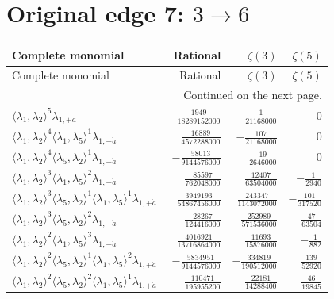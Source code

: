 \section{Original edge 7: $3\to 6$}
\begin{longtable}{@{}lrrr@{}}
\toprule
Complete monomial & Rational & $\zeta(3)$ & $\zeta(5)$ \\
\midrule\endfirsthead
\toprule Complete monomial & Rational & $\zeta(3)$ & $\zeta(5)$ \\
\midrule\endhead
\midrule\multicolumn{4}{r}{Continued on the next page.}\\\endfoot
\bottomrule\endlastfoot
$\langle\lambda_1,\lambda_2\rangle^{5}\lambda_{1,+\dot a}$ & $-\frac{1949}{18289152000}$ & $\frac{1}{21168000}$ & $0$ \\
$\langle\lambda_1,\lambda_2\rangle^{4}\langle\lambda_1,\lambda_5\rangle^{1}\lambda_{1,+\dot a}$ & $\frac{16889}{4572288000}$ & $-\frac{107}{21168000}$ & $0$ \\
$\langle\lambda_1,\lambda_2\rangle^{4}\langle\lambda_5,\lambda_2\rangle^{1}\lambda_{1,+\dot a}$ & $-\frac{58013}{9144576000}$ & $\frac{19}{2646000}$ & $0$ \\
$\langle\lambda_1,\lambda_2\rangle^{3}\langle\lambda_1,\lambda_5\rangle^{2}\lambda_{1,+\dot a}$ & $\frac{85597}{762048000}$ & $\frac{12407}{63504000}$ & $-\frac{1}{2940}$ \\
$\langle\lambda_1,\lambda_2\rangle^{3}\langle\lambda_5,\lambda_2\rangle^{1}\langle\lambda_1,\lambda_5\rangle^{1}\lambda_{1,+\dot a}$ & $\frac{3949193}{54867456000}$ & $\frac{243347}{1143072000}$ & $-\frac{101}{317520}$ \\
$\langle\lambda_1,\lambda_2\rangle^{3}\langle\lambda_5,\lambda_2\rangle^{2}\lambda_{1,+\dot a}$ & $-\frac{28267}{124416000}$ & $-\frac{252989}{571536000}$ & $\frac{47}{63504}$ \\
$\langle\lambda_1,\lambda_2\rangle^{2}\langle\lambda_1,\lambda_5\rangle^{3}\lambda_{1,+\dot a}$ & $\frac{4016921}{13716864000}$ & $\frac{11693}{15876000}$ & $-\frac{1}{882}$ \\
$\langle\lambda_1,\lambda_2\rangle^{2}\langle\lambda_5,\lambda_2\rangle^{1}\langle\lambda_1,\lambda_5\rangle^{2}\lambda_{1,+\dot a}$ & $-\frac{5834951}{9144576000}$ & $-\frac{334819}{190512000}$ & $\frac{139}{52920}$ \\
$\langle\lambda_1,\lambda_2\rangle^{2}\langle\lambda_5,\lambda_2\rangle^{2}\langle\lambda_1,\lambda_5\rangle^{1}\lambda_{1,+\dot a}$ & $\frac{110471}{195955200}$ & $\frac{22181}{14288400}$ & $-\frac{46}{19845}$ \\

\end{longtable}
